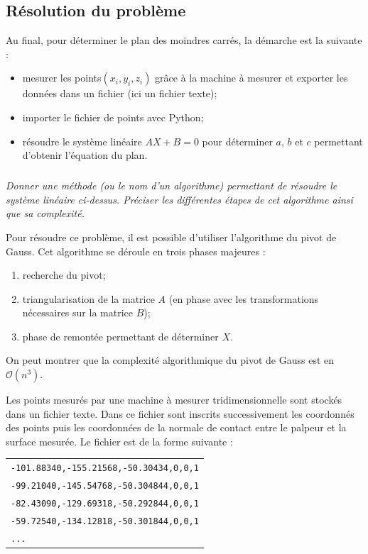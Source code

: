 \else
\fi


\subsection{Résolution du problème}
\ifprof
\else
\begin{methode}
Au final, pour déterminer le plan des moindres carrés, la démarche est la suivante :
\begin{itemize}
\item mesurer les points$(x_i,y_i,z_i)$ grâce à la machine à mesurer et exporter les données dans un fichier (ici un fichier texte);
\item importer le fichier de points avec Python;
\item résoudre le système linéaire $AX+B=0$ pour déterminer $a$, $b$ et $c$ permettant d'obtenir l'équation du plan. 
\end{itemize}
\end{methode}
\fi

\subparagraph{}
\textit{Donner une méthode (ou le nom d'un algorithme) permettant de résoudre le système linéaire ci-dessus. Préciser les différentes étapes de cet algorithme ainsi que sa complexité.}


\ifprof
\begin{corrige}
Pour résoudre ce problème, il est possible d'utiliser l'algorithme du pivot de Gauss. Cet algorithme se déroule en trois phases majeures : 
\begin{enumerate}
\item recherche du pivot;
\item triangularisation de la matrice $A$ (en phase avec les transformations nécessaires sur la matrice $B$);
\item phase de remontée permettant de déterminer $X$. 
\end{enumerate}

On peut montrer que la complexité algorithmique du pivot de Gauss est en $\mathcal{O}\left(n^3\right)$.
\end{corrige}
\else
\fi
\ifprof
\else
\vspace{.5cm}

Les points mesurés par une machine à mesurer tridimensionnelle sont stockés dans un fichier texte. Dans ce fichier sont inscrits successivement les coordonnés des points puis les coordonnées de la normale de contact entre le palpeur et la surface mesurée. Le fichier est de la forme suivante : 

\begin{tabular}{l}
\texttt{-101.88340,-155.21568,-50.30434,0,0,1}\\
\texttt{-99.21040,-145.54768,-50.304844,0,0,1}\\
\texttt{-82.43090,-129.69318,-50.292844,0,0,1}\\
\texttt{-59.72540,-134.12818,-50.301844,0,0,1}\\
\texttt{...} \\
\end{tabular}

